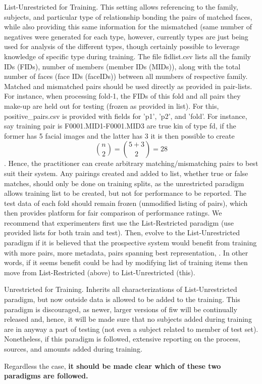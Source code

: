     \begin{step}{List-Unrestricted for Training.} This setting allows referencing to the family, subjects, and particular type of relationship bonding the pairs of matched faces, while also providing this same information for the mismatched (\ie same number of negatives were generated for each type, however, currently types are just being used for analysis of the different types, though certainly possible to leverage knowledge of specific type during training. The file fidlist.csv lists all the family IDs (FIDs), number of members (\ie member IDs (MIDs)), along with the total number of faces (\ie face IDs (faceIDs)) between all mumbers of respective family. Matched and mismatched pairs should be used directly as provided in pair-lists. For instance, when processing fold-1, the FIDs of this fold and all pairs they make-up are held out for testing (\ie frozen as provided in list). For this, positive\_pairs.csv is provided with fields for 'p1', 'p2', and 'fold'. For instance, say training pair is F0001.MID1-F0001.MID3 are true kin of type \gls{fd}, if the former has 5 facial images and the latter has 3 it is then possible to create $$\binom{n}{2}=\binom{5+3}{2}=28$$. Hence, the practitioner can create arbitrary matching/mismatching pairs to best suit their system. Any pairings created and added to list, whether true or false matches, should only be done on training splits, as the unrestricted paradigm allows training list to be created, but not for performance to be reported. The test data of each fold should remain frozen (\ie unmodified listing of pairs), which then provides platform for fair comparison of performance ratings. We recommend that experimenters first use the List-Restricted paradigm (\ie use provided lists for both train and test). Then, evolve to the List-Unrestricted paradigm if it is believed that the prospective system would benefit from training with more pairs, more metadata, pairs spanning best representation, \etc. In other words, if it seems benefit could be had by modifying list of training items then move from List-Restricted (above) to List-Unrestricted (this). 
     \end{step}
    
    
\begin{step}{Unrestricted for Training.} Inherits all characterizations of List-Unrestricted paradigm, but now outside data is allowed to be added to the training. This paradigm is discouraged, as newer, larger versions of \gls{fiw} will be continually released and, hence, it will be made sure that no subjects added during training are in anyway a part of testing (\ie not even a subject related to member of test set). Nonetheless, if this paradigm is followed, extensive reporting on the process, sources, and amounts added during training.
 \end{step}
Regardless the case, \textbf{it should be made clear which of these two paradigms are followed.}

